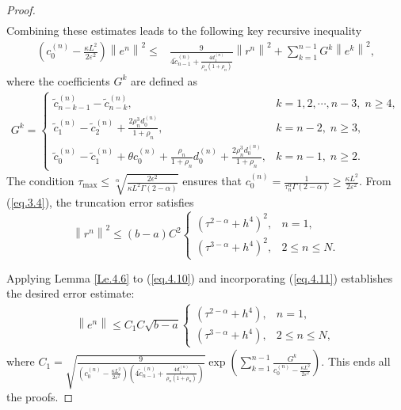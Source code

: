 \documentclass[10pt,a4paper]{amsart}
\begin{document}
\begin{proof}
\begin{align*}
	\end{align*}
Combining these estimates leads to the following key recursive inequality
\begin{equation}\label{eq.4.10}
\begin{aligned}
\left(c_{0}^{(n)} - \frac{\kappa L^2}{2\varepsilon^2}\right)
\left\|e^n\right\|^2 \leq &\frac{9}{4\widetilde{c}_{n-1}^{(n)} + \frac{4 d_{1}^{(n)}}{\rho_{n}(1+\rho_{n})}}\left\|r^n\right\|^2
+ \sum\limits_{k=1}^{n-1}G^k\left\|e^k\right\|^2,
\end{aligned}
\end{equation}
where the coefficients $G^k$ are defined as
\begin{align*}
G^k =
\begin{cases}
\widetilde{c}_{n-k-1}^{(n)} - \widetilde{c}_{n-k}^{(n)},
 & k =1,2,\cdots,n-3, \; n\geq 4, \\
\widetilde{c}_{1}^{(n)} - \widetilde{c}_{2}^{(n)} + \frac{2\rho_{n}^3 d_{0}^{(n)}}{1+\rho_{n}}, & k=n-2, \; n \geq 3, \\
\widetilde{c}_{0}^{(n)} - \widetilde{c}_{1}^{(n)} + \theta c_{0}^{(n)} + \frac{\rho_{n}}{1+\rho_{n}}d_{0}^{(n)}
+ \frac{2\rho_{n}^3 d_{0}^{(n)}}{1+\rho_{n}}, & k=n-1, \; n\geq 2.
\end{cases}
\end{align*}
The condition $\tau_{\max} \leq \sqrt[\alpha]{\frac{2\epsilon^2}{\kappa L^2 \Gamma(2-\alpha)}}$ ensures that
$
    c_{0}^{(n)} = \frac{1}{\tau_{n}^\alpha \Gamma(2-\alpha)} \geq \frac{\kappa L^2}{2\varepsilon^2}.
$
From (\ref{eq.3.4}), the truncation error satisfies
\begin{equation}\label{eq.4.11}
\left\|r^n\right\|^2 \leq (b-a)C^2
\begin{cases}
\left(\tau^{2-\alpha}+h^4\right)^2, & n =1, \\
\left(\tau^{3-\alpha}+h^4\right)^2, & 2\leq n \leq N.
\end{cases}
\end{equation}

Applying Lemma \ref{Le.4.6} to (\ref{eq.4.10}) and incorporating (\ref{eq.4.11}) establishes the desired error estimate:
\begin{align*}
    \left\| e^n \right\| \leq C_1 C \sqrt{b-a}
    \begin{cases}
        \left(\tau^{2-\alpha} + h^4\right), & n = 1, \\
        \left(\tau^{3-\alpha} + h^4\right), & 2 \leq n \leq N,
    \end{cases}
\end{align*}
where $C_1 = \sqrt{\frac{9}{\left(c_{0}^{(n)} - \frac{\kappa L^2}{2\varepsilon^2}\right) \left(4\widetilde{c}_{n-1}^{(n)} + \frac{4 d_{1}^{(n)}}{\rho_{n}(1+\rho_{n})}\right)}} \exp\left(\sum\limits_{k=1}^{n-1} \frac{G^k}{c_{0}^{(n)} - \frac{\kappa L^2}{2\varepsilon^2}}\right)$. This ends all the proofs.
\end{proof}
\end{document}
